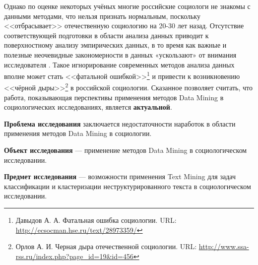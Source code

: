 Однако по оценке некоторых учёных многие российские социологи не знакомы с данными методами, что нельзя признать нормальным, поскольку <<отбрасывает>> отечественную социологию на 20-30 лет назад. Отсутствие соответствующей подготовки в области анализа данных приводит к поверхностному анализу эмпирических данных, в то время как важные и полезные неочевидные закономерности в данных «ускользают» от внимания исследователя \cite{Davydov_Knowledge}. Такое игнорирование современных методов анализа данных вполне может стать <<фатальной ошибкой>>\footnote{Давыдов А. А. Фатальная ошибка социологии. URL: \url{http://ecsocman.hse.ru/text/28973359/}}  и привести к возникновению <<чёрной дыры>>\footnote{Орлов А. И. Черная дыра отечественной социологии. URL: \url{http://www.ssa-rss.ru/index.php?page_id=19&id=456}} в российской социологии. Сказанное позволяет считать, что работа, показывающая перспективы применения методов Data Mining в социологических исследованиях, является \textbf{актуальной}. 

\textbf{Проблема исследования} заключается недостаточности наработок в области применения методов Data Mining в социологии.

\textbf{Объект исследования} --- применение методов Data Mining в социологическом исследовании.

\textbf{Предмет исследования} --- возможности применения Text Mining для задач классификации и кластеризации неструктурированного текста в социологическом исследовании.
\clearpage